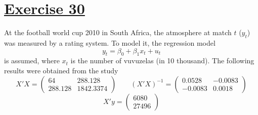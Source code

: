 \documentclass[captions=tableheading, 12pt, headings=small, parskip=half]{scrartcl}
\begin{document}
\section*{\underline{Exercise 30}}
At the football world cup 2010 in South Africa, the atmosphere at match $t$ ($y_t$) was measured by a rating system. To model it, the regression model
\[y_t = \beta_0 + \beta_1x_t + u_t\]
is assumed, where $x_t$ is the number of vuvuzelas (in 10 thousand). The following results were obtained from the study
\[
X'X= \begin{pmatrix}
64&288.128\\288.128&1842.3374
\end{pmatrix}\qquad (X'X)^{-1} = \begin{pmatrix}
0.0528&-0.0083\\-0.0083&0.0018
\end{pmatrix}
\]\[
X'y = \begin{pmatrix}
6080\\27496
\end{pmatrix}
\]
\end{document}
